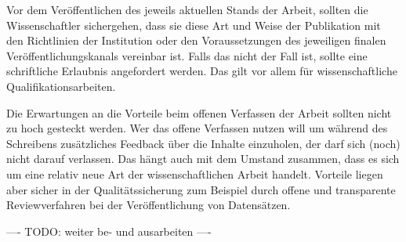 Vor dem Veröffentlichen des jeweils aktuellen Stands der Arbeit, sollten die Wissenschaftler sichergehen, dass sie diese Art und Weise der Publikation mit den Richtlinien der Institution oder den Voraussetzungen des jeweiligen finalen Veröffentlichungskanals vereinbar ist. Falls das nicht der Fall ist, sollte eine schriftliche Erlaubnis angefordert werden. Das gilt vor allem für wissenschaftliche Qualifikationsarbeiten.

Die Erwartungen an die Vorteile beim offenen Verfassen der Arbeit sollten nicht zu hoch gesteckt werden. Wer das offene Verfassen nutzen will um während des Schreibens zusätzliches Feedback über die Inhalte einzuholen, der darf sich (noch) nicht darauf verlassen. Das hängt auch mit dem Umstand zusammen, dass es sich um eine relativ neue Art der wissenschaftlichen Arbeit handelt. Vorteile liegen aber sicher in der Qualitätssicherung zum Beispiel durch offene und transparente Reviewverfahren bei der Veröffentlichung von Datensätzen.

---- TODO: weiter be- und ausarbeiten ----
